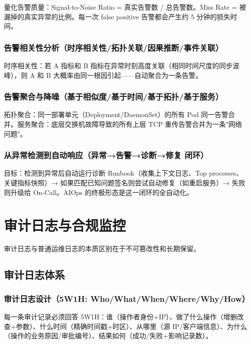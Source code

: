 \documentclass[12pt,UTF8]{ctexbook}
\begin{document}
量化告警质量：Signal-to-Noise Ratio = 真实告警数 / 总告警数。Miss Rate = 被漏掉的真实异常的比例。每一次 false positive 告警都会产生约 5 分钟的损失时间。

    \subsection{告警相关性分析（时序相关性/拓扑关联/因果推断/事件关联）}

时序相关性：若 A 指标和 B 指标在异常时刻高度关联（相同时间尺度的同步波峰），则 A 和 B 大概率由同一根因引起——自动聚合为一条告警。

    \subsection{告警聚合与降噪（基于相似度/基于时间/基于拓扑/基于服务）}

拓扑聚合：同一部署单元（Deployment/DaemonSet）的所有 Pod 同一告警合并。服务聚合：底层交换机故障导致的所有上层 TCP 重传告警合并为一条"网络问题"。

    \subsection{从异常检测到自动响应（异常→告警→诊断→修复 闭环）}

目标：检测到异常后自动运行诊断 Runbook（收集上下文日志、Top processes、关键指标快照）→ 如果匹配已知问题签名则尝试自动修复（如重启服务）→ 失败则升级给 On-Call。AIOps 的终极形态是这一闭环的全自动化。

\chapter{审计日志与合规监控}
\label{chap:audit-logging}

审计日志与普通运维日志的本质区别在于不可篡改性和长期保留。

  \section{审计日志体系}
    \subsection{审计日志设计（5W1H: Who/What/When/Where/Why/How）}

每一条审计记录必须回答 5W1H：谁（操作者身份+IP）、做了什么操作（增删改查+参数）、什么时间（精确时间戳+时区）、从哪里（源 IP/客户端信息）、为什么（操作的业务原因/审批编号）、结果如何（成功/失败+影响记录数）。
\end{document}

